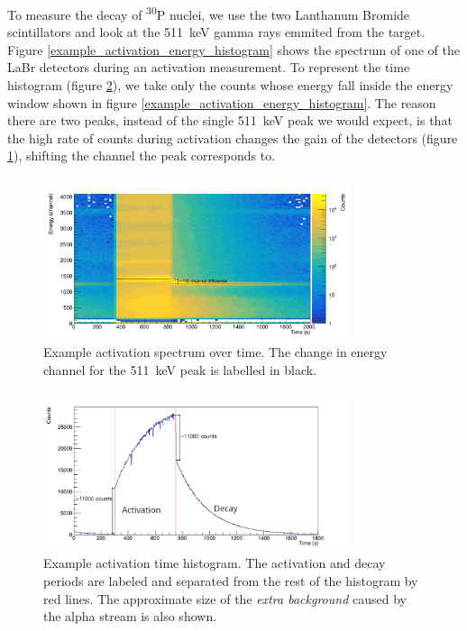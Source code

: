 \documentclass[a4paper,12pt]{report}
\newcommand{\Piso}{\textsuperscript{30}P }
\begin{document}
To measure the decay of \Piso nuclei, we use the two Lanthanum Bromide scintillators and look at the \qty{511}{\keV} gamma rays emmited from the target.
Figure \ref{example_activation_energy_histogram} shows the spectrum of one of the LaBr detectors during an activation measurement.
To represent the time histogram (figure \ref{example_activation_time_histogram}), we take only the counts whose energy fall inside the energy window shown in figure \ref{example_activation_energy_histogram}.
The reason there are two peaks, instead of the single \qty{511}{\keV} peak we would expect, is that the high rate of counts during activation changes the gain of the detectors (figure \ref{example_activation_energytime}), shifting the channel the peak corresponds to.

\begin{figure}[H]
	\centering
	\includegraphics[width=0.80\textwidth]{example_activation_energytime.png}
	\caption{Example activation spectrum over time.
	The change in energy channel for the \qty{511}{\keV} peak is labelled in black.}
	\label{example_activation_energytime}
\end{figure}

\begin{figure}[H]
	\centering
	\includegraphics[width=0.80\textwidth]{example_activation_time_histogram.png}
	\caption{Example activation time histogram.
	The activation and decay periods are labeled and separated from the rest of the histogram by red lines.
	The approximate size of the \textit{extra background} caused by the alpha stream is also shown.}
	\label{example_activation_time_histogram}
\end{figure}
\end{document}
